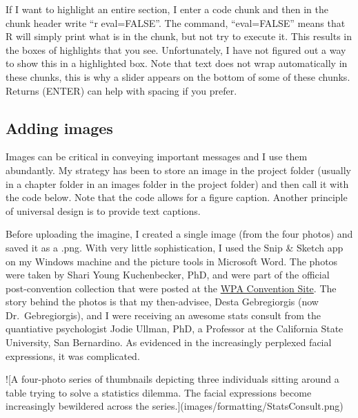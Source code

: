 \documentclass[
]{book}
\newenvironment{Shaded}{\begin{snugshade}}{\end{snugshade}}
\newcommand{\NormalTok}[1]{#1}
\newcommand{\SpecialCharTok}[1]{\textcolor[rgb]{0.00,0.00,0.00}{#1}}
\begin{document}
If I want to highlight an entire section, I enter a code chunk and then in the chunk header write ``r eval=FALSE''. The command, ``eval=FALSE'' means that R will simply print what is in the chunk, but not try to execute it. This results in the boxes of highlights that you see. Unfortunately, I have not figured out a way to show this in a highlighted box. Note that text does not wrap automatically in these chunks, this is why a slider appears on the bottom of some of these chunks. Returns (ENTER) can help with spacing if you prefer.

\hypertarget{adding-images}{%
\subsection{Adding images}\label{adding-images}}

Images can be critical in conveying important messages and I use them abundantly. My strategy has been to store an image in the project folder (usually in a chapter folder in an images folder in the project folder) and then call it with the code below. Note that the code allows for a figure caption. Another principle of universal design is to provide text captions.

Before uploading the imagine, I created a single image (from the four photos) and saved it as a .png. With very little sophistication, I used the Snip \& Sketch app on my Windows machine and the picture tools in Microsoft Word. The photos were taken by Shari Young Kuchenbecker, PhD, and were part of the official post-convention collection that were posted at the \href{https://westernpsych.org/2018-convention-photos/}{WPA Convention Site}. The story behind the photos is that my then-advisee, Desta Gebregiorgis (now Dr.~Gebregiorgis), and I were receiving an awesome stats consult from the quantiative psychologist Jodie Ullman, PhD, a Professor at the California State University, San Bernardino. As evidenced in the increasingly perplexed facial expressions, it was complicated.

\begin{Shaded}
\begin{Highlighting}[]
\SpecialCharTok{!}\NormalTok{[A four}\SpecialCharTok{{-}}\NormalTok{photo series of thumbnails depicting three individuals sitting around a table trying to solve a statistics dilemma. The facial expressions become increasingly bewildered across the series.](images}\SpecialCharTok{/}\NormalTok{formatting}\SpecialCharTok{/}\NormalTok{StatsConsult.png)}
\end{Highlighting}
\end{Shaded}
\end{document}
